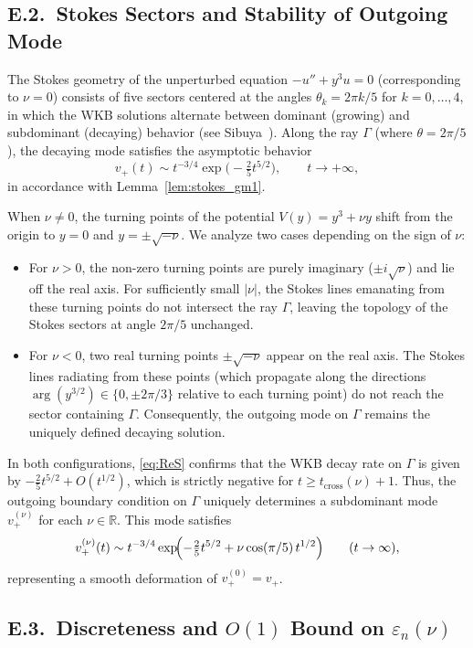 \documentclass[12pt,a4paper]{amsart}
\theoremstyle{remark}
\begin{document}
\subsection*{E.2.~Stokes Sectors and Stability of Outgoing Mode}
\label{subsec:stokes_sectors}

The Stokes geometry of the unperturbed equation $-u'' + y^3 u = 0$ (corresponding to $\nu = 0$)
consists of five sectors centered at the angles $\theta_k = 2\pi k/5$ for $k = 0,\ldots,4$, in which
the WKB solutions alternate between dominant (growing) and subdominant (decaying) behavior
(see Sibuya~\cite{Sibuya75}). Along the ray $\Gamma$ (where $\theta = 2\pi/5$), the decaying mode satisfies
the asymptotic behavior
\[
  v_+(t) \sim t^{-3/4}\exp\!\bigl(-\tfrac{2}{5}t^{5/2}\bigr),
  \qquad t \to +\infty,
\]
in accordance with Lemma~\ref{lem:stokes_gm1}.

When $\nu \neq 0$, the turning points of the potential $V(y) = y^3 + \nu y$ shift from the origin
to $y = 0$ and $y = \pm\sqrt{-\nu}$. We analyze two cases depending on the sign of $\nu$:
\begin{itemize}
\item For $\nu > 0$, the non-zero turning points are purely imaginary ($\pm i\sqrt{\nu}$) and lie
  off the real axis. For sufficiently small $|\nu|$, the Stokes lines emanating from these turning
  points do not intersect the ray $\Gamma$, leaving the topology of the Stokes sectors at angle
  $2\pi/5$ unchanged.
\item For $\nu < 0$, two real turning points $\pm\sqrt{-\nu}$ appear on the real axis. The Stokes lines
  radiating from these points (which propagate along the directions
  $\arg(y^{3/2})\in\{0,\pm 2\pi/3\}$ relative to each turning point) do not reach the sector containing
  $\Gamma$. Consequently, the outgoing mode on $\Gamma$ remains the uniquely defined decaying solution.
\end{itemize}
In both configurations, \eqref{eq:ReS} confirms that the WKB decay rate on $\Gamma$
is given by $-\frac{2}{5}t^{5/2} + O(t^{1/2})$, which is strictly negative for
$t \geq t_{\mathrm{cross}}(\nu) + 1$. Thus, the outgoing boundary condition on $\Gamma$
uniquely determines a subdominant mode $v_+^{(\nu)}$ for each $\nu \in \mathbb{R}$.
This mode satisfies
\[
  v_+^{(\nu)}(t) \sim t^{-3/4}
  \exp\!\Bigl(-\tfrac{2}{5}t^{5/2} + \nu\cos(\pi/5)\,t^{1/2}\Bigr)
  \qquad (t\to\infty),
\]
representing a smooth deformation of $v_+^{(0)} = v_+$.

\subsection*{E.3.~Discreteness and $O(1)$ Bound on $\varepsilon_n(\nu)$}
\end{document}
